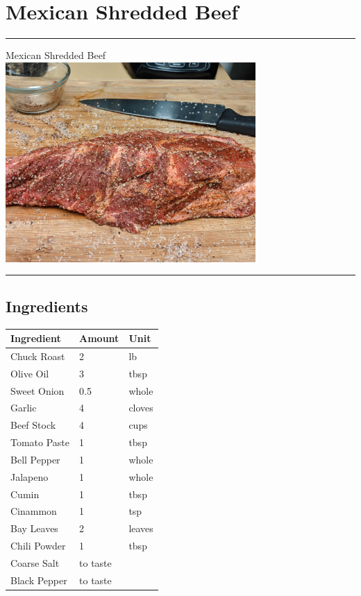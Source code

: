 \documentclass[11pt,]{article}
\begin{document}
\break 

\section{Mexican Shredded Beef}\label{mexican-shredded-beef}

\hrule  \vspace{5 mm}

\HUGE Mexican Shredded
Beef\normalsize \hfill \includegraphics[align=c, height=3in]{recipes/Mexican Shredded Beef/shred_beef.jpg}

\vspace{5 mm} \hrule 

\subsection{Ingredients}\label{ingredients-4}

\begin{tabular}{l|l|l}
\hline
Ingredient & Amount & Unit\\
\hline
Chuck Roast & 2 & lb\\
\hline
Olive Oil & 3 & tbsp\\
\hline
Sweet Onion & 0.5 & whole\\
\hline
Garlic & 4 & cloves\\
\hline
Beef Stock & 4 & cups\\
\hline
Tomato Paste & 1 & tbsp\\
\hline
Bell Pepper & 1 & whole\\
\hline
Jalapeno & 1 & whole\\
\hline
Cumin & 1 & tbsp\\
\hline
Cinammon & 1 & tsp\\
\hline
Bay Leaves & 2 & leaves\\
\hline
Chili Powder & 1 & tbsp\\
\hline
Coarse Salt & to taste & \\
\hline
Black Pepper & to taste & \\
\hline
\end{tabular}
\end{document}
